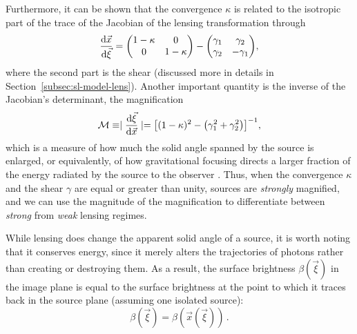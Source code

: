 Furthermore, it can be shown that the convergence $\kappa$ is related to the isotropic part of the trace of the Jacobian of the lensing transformation through
\begin{equation}\label{eq:lens-jacobian}
	\frac{\dd{\vec{x}}}{\dd{\vec{\xi}}} = \mqty(\dmat[0]{1-\kappa, 1-\kappa}) - \mqty(\gamma_1 & \gamma_2 \\ \gamma_2 & -\gamma_1),
\end{equation}
where the second part is the shear (discussed more in details in Section~\ref{subsec:sl-model-lens}).
Another important quantity is the inverse of the Jacobian's determinant, the magnification
\begin{equation}
	\mathcal{M} \equiv \mid\frac{\dd{\vec{\xi}}}{\dd{\vec{x}}}\mid  = \qty[(1-\kappa)^2 - \qty(\gamma_1^2 + \gamma_2^2)]^{-1},
\end{equation}
which is a measure of how much the solid angle spanned by the source is enlarged, or equivalently, of how gravitational focusing directs a larger fraction of the energy radiated by the source to the observer \cite{Bartelmann:1999yn}. Thus, when the convergence $\kappa$ and the shear $\gamma$ are equal or greater than unity, sources are \emph{strongly} magnified, and we can use the magnitude of the magnification to differentiate between \emph{strong} from \emph{weak} lensing regimes.

While lensing does change the apparent solid angle of a source, it is worth noting that it conserves energy, since it merely alters the trajectories of photons rather than creating or destroying them. As a result, the surface brightness $\beta(\vec{\xi})$ in the image plane is equal to the surface brightness at the point to which it traces back in the source plane (assuming one isolated source):
\begin{equation}
    \beta(\vec{\xi}) = \beta(\vec{x}(\vec{\xi})) \, .
\end{equation}

